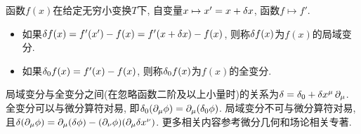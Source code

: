 \begin{proposition}[局域变分与全变分]\label{pro:局域变分与全变分}
    函数$ f(x) $在给定无穷小变换$ T $下, 自变量$ x \mapsto x' = x + \var{x} $, 函数$ f \mapsto f' $.
    \begin{itemize}
        \item 如果$ \var{f(x)} = f'(x') - f(x) = f'(x+\var{x}) - f(x) $, 则称$ \var{f(x)} $为$ f(x) $的局域变分.
        \item 如果$ \var_0{f(x)} = f'(x) - f(x) $, 则称$ \var_0{f(x)} $为$ f(x) $的全变分.
    \end{itemize}
    局域变分与全变分之间(在忽略函数二阶及以上小量时)的关系为$ \var = \var_0 + \var{x^{\mu}} \partial_{\mu} $. 全变分可以与微分算符对易, 即$ \var_0{(\partial_{\mu} \phi)} = \partial_{\mu} (\var_0 \phi) $. 局域变分不可与微分算符对易, 且$ \var{(\partial_{\mu} \phi)} = \partial_{\mu} (\var \phi) - (\partial_{\nu} \phi)(\partial_{\mu} \var x^{\nu}) $. 更多相关内容参考微分几何和场论相关专著.
\end{proposition}

